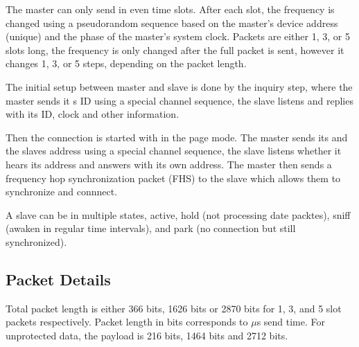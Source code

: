 The master can only send in even time slots. After each slot, the frequency is
changed using a pseudorandom sequence based on the master's device address
(unique) and the phase of the master's system clock. Packets are either 1, 3, or
5 slots long, the frequency is only changed after the full packet is sent,
however it changes 1, 3, or 5 steps, depending on the packet length.

The initial setup between master and slave is done by the inquiry step, where
the master sends it s ID using a special channel sequence, the slave listens and
replies with its ID, clock and other information.

Then the connection is started with in the page mode. The master sends its and
the slaves address using a special channel sequence, the slave listens whether
it hears its address and answers with its own address. The master then sends a
frequency hop synchronization packet (FHS) to the slave which allows them to
synchronize and connnect.

A slave can be in multiple states, active, hold (not processing date packtes),
sniff (awaken in regular time intervals), and park (no connection but still
synchronized).

\subsection{Packet Details}
Total packet length is either 366 bits, 1626 bits or 2870 bits for 1, 3, and 5
slot packets respectively. Packet length in bits corresponds to $\mu$s send
time. For unprotected data, the payload is 216 bits, 1464 bits and 2712 bits.
